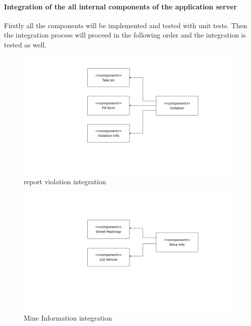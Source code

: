 \paragraph{Integration of the all internal components of the application server}
Firstly all the components will be implemented and tested with unit tests. Then the integration process will proceed in the following order and the integration is tested as well.

\begin{figure}[H]
\centering
\includegraphics[width=\textwidth]{Images/reportviolationintegration.png}
\caption{\label{fig:reportviolationintegration} report violation integration}
\end{figure}

\begin{figure}[H]
\centering
\includegraphics[width=\textwidth]{Images/MineInfoIntegration.png}
\caption{\label{fig:MineInfoIntegration} Mine Information integration}
\end{figure}

